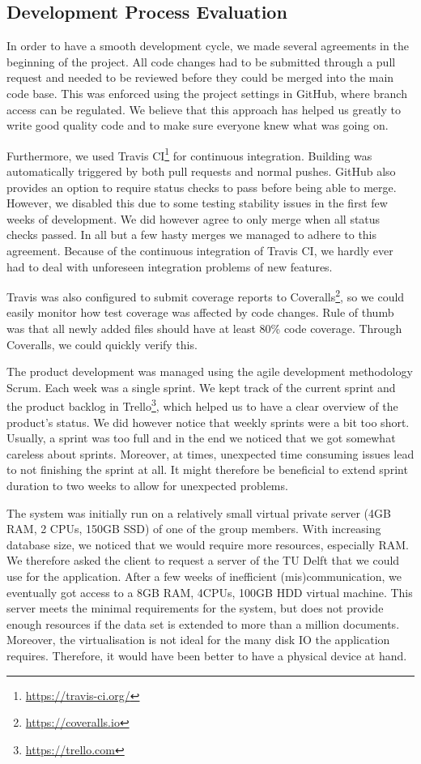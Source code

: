 \subsection{Development Process Evaluation}
In order to have a smooth development cycle, we made several agreements in the beginning of the project. All code changes had to be submitted through a pull request and needed to be reviewed before they could be merged into the main code base. This was enforced using the project settings in GitHub, where branch access can be regulated. We believe that this approach has helped us greatly to write good quality code and to make sure everyone knew what was going on.

Furthermore, we used Travis CI\footnote{\url{https://travis-ci.org/}} for continuous integration. Building was automatically triggered by both pull requests and normal pushes. GitHub also provides an option to require status checks to pass before being able to merge. However, we disabled this due to some testing stability issues in the first few weeks of development. We did however agree to only merge when all status checks passed. In all but a few hasty merges we managed to adhere to this agreement. Because of the continuous integration of Travis CI, we hardly ever had to deal with unforeseen integration problems of new features.

Travis was also configured to submit coverage reports to Coveralls\footnote{\url{https://coveralls.io}}, so we could easily monitor how test coverage was affected by code changes. Rule of thumb was that all newly added files should have at least 80\% code coverage. Through Coveralls, we could quickly verify this. 

The product development was managed using the agile development methodology Scrum. Each week was a single sprint. We kept track of the current sprint and the product backlog in Trello\footnote{\url{https://trello.com}}, which helped us to have a clear overview of the product's status. We did however notice that weekly sprints were a bit too short. Usually, a sprint was too full and in the end we noticed that we got somewhat careless about sprints. Moreover, at times, unexpected time consuming issues lead to not finishing the sprint at all. It might therefore be beneficial to extend sprint duration to two weeks to allow for unexpected problems.

The system was initially run on a relatively small virtual private server (4GB RAM, 2 CPUs, 150GB SSD) of one of the group members. With increasing database size, we noticed that we would require more resources, especially RAM. We therefore asked the client to request a server of the TU Delft that we could use for the application. After a few weeks of inefficient (mis)communication, we eventually got access to a 8GB RAM, 4CPUs, 100GB HDD virtual machine. This server meets the minimal requirements for the system, but does not provide enough resources if the data set is extended to more than a million documents. Moreover, the virtualisation is not ideal for the many disk IO the application requires. Therefore, it would have been better to have a physical device at hand.

